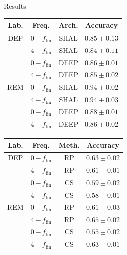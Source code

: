 \documentclass{beamer}
\begin{document}
\begin{frame}{Results}
\begin{table}[tbp]
\centering
\scriptsize
  \parbox{0.495\linewidth}{
\centering
\begin{tabular}{|c|c|c|c|}
\hline
\textbf{Lab.} & \textbf{Freq.} & \textbf{Arch.} & \textbf{Accuracy} \\ \hline
DEP & $0-f_{\text{fin}}$ & SHAL &  $0.85 \pm 0.13$    \\ \hline 
 & $4-f_{\text{fin}}$ & SHAL &     $0.84 \pm 0.11$    \\ \hline 
 & $0-f_{\text{fin}}$ & DEEP &     $\mathbf{0.86} \pm 0.01$    \\ \hline 
 & $4-f_{\text{fin}}$ & DEEP &     $0.85 \pm 0.02$    \\ \hline 
REM & $0-f_{\text{fin}}$ & SHAL &  $\mathbf{0.94} \pm 0.02$    \\ \hline 
 & $4-f_{\text{fin}}$ & SHAL &     $0.94 \pm 0.03$    \\ \hline 
 & $0-f_{\text{fin}}$ & DEEP &     $0.88 \pm 0.01$    \\ \hline 
 & $4-f_{\text{fin}}$ & DEEP &     $0.86 \pm 0.02$    \\ \hline 
\end{tabular}
}
\hfill
  \parbox{0.495\linewidth}{
\centering
\begin{tabular}{|c|c|c|c|}
\hline
\textbf{Lab.} & \textbf{Freq.} & \textbf{Meth.} & \textbf{Accuracy} \\ \hline
DEP & $0-f_{\text{fin}}$ & RP & $\mathbf{0.63} \pm 0.02$ \\ \hline 
& $4-f_{\text{fin}}$ & RP & $0.61 \pm 0.01$   \\ \hline 
& $0-f_{\text{fin}}$ & CS & $0.59 \pm 0.02$  \\ \hline 
& $4-f_{\text{fin}}$ & CS & $0.58 \pm 0.01$ \\ \hline 
REM & $0-f_{\text{fin}}$ & RP & $0.61 \pm 0.03$ \\ \hline 
 & $4-f_{\text{fin}}$ & RP &  $\mathbf{0.65} \pm 0.02$    \\ \hline 
 & $0-f_{\text{fin}}$ & CS &  $0.55 \pm 0.02$ \\ \hline 
 & $4-f_{\text{fin}}$ & CS &  $0.63 \pm 0.01$ \\ \hline 
\end{tabular}
}
\end{table}
\end{frame}
\end{document}
